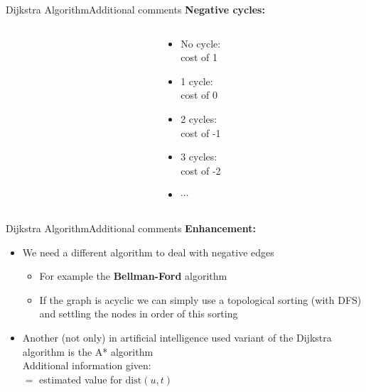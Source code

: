 
\begin{frame}{Dijkstra Algorithm}{Additional comments}
  \textbf{Negative cycles:}
  \begin{columns}[c]
    \begin{column}{0.7\linewidth}
      \begin{adjustbox}{width=\linewidth}
        \def\DijkstraNegativeCycle{1}%
        
      \end{adjustbox}
    \end{column}
    \begin{column}{0.3\linewidth}
      \begin{itemize}
        \item
          No cycle:\\
          {\color{MainA}cost of 1}
        \item
          1 cycle:\\
          {\color{MainA}cost of 0}
        \item
          2 cycles:\\
          {\color{MainA}cost of -1}
        \item
          3 cycles:\\
          {\color{MainA}cost of -2}
        \item
          $\cdots$
      \end{itemize}
    \end{column}
  \end{columns}
\end{frame}


\begin{frame}{Dijkstra Algorithm}{Additional comments}
  \textbf{Enhancement:}
  \begin{itemize}
    \item
      We need a different algorithm to deal with negative edges
      \begin{itemize}
        \item
          For example the \textbf{Bellman-Ford} algorithm
        \item
          If the graph is {\color{MainA}acyclic} we can simply use a
          topological sorting (with DFS) and settling the nodes in order
          of this sorting
      \end{itemize}
    \item
      Another (not only) in artificial intelligence used variant of the Dijkstra
      algorithm is the {\color{MainA}A* algorithm}\\
      Additional information given:\\
      $=$ estimated value for {\color{MainA}$\mathrm{dist}(u, t)$}
  \end{itemize}
\end{frame}

